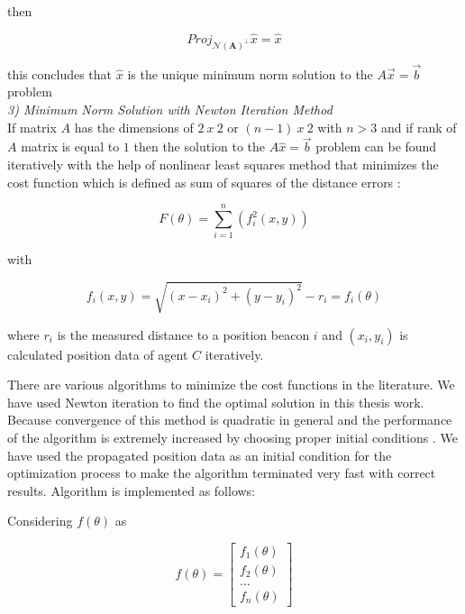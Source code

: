 then 
  
\begin{equation}
Proj_{ \mathcal{N}(\mathbf{A})^\perp}\hat{x} = \hat{x}
\end{equation}
  
this concludes that $\hat{x}$ is the unique minimum norm solution to the $A\vec{x} = \vec{b}$ problem\\
	
	
\textit{3) Minimum Norm Solution with Newton Iteration Method}\\	
If matrix $A$ has the dimensions of $2\ x\ 2$ or $(n-1)\ x\ 2$ with $n>3$ and if rank of $A$ matrix is equal to $1$ then the solution to the $A\hat{x} = \vec{b}$ problem can be found iteratively with the help of nonlinear least squares method that minimizes the cost function which is defined as sum of squares of the distance errors \cite{22} :
	
\begin{equation} \label{cost_func_tri}
F(\theta) = \sum_{i=1}^{n} \left(f_i^2(x,y)\right)
\end{equation}
	
with
	
\begin{equation}
f_i(x,y) = \sqrt{(x-x_i)^2 + (y - y_i)^2} - r_i = f_i(\theta) 
\end{equation}

where $r_i$ is the measured distance to a position beacon $i$ and $(x_i, y_i)$ is calculated position data of agent $C$ iteratively.

There are various algorithms to minimize the cost functions in the literature. We have used Newton iteration to find the optimal solution in this thesis work. Because convergence of this method is quadratic in general and the performance of the algorithm is extremely increased by choosing proper initial conditions \cite{wiki_newton}. We have used the propagated position data as an initial condition for the optimization process to make the algorithm terminated very fast with correct results. Algorithm is implemented as follows:

Considering  $f(\theta)$ as

\begin{equation}
f(\theta) = \begin{bmatrix}
f_1(\theta) \\
f_2(\theta) \\
...         \\
f_n(\theta)
\end{bmatrix}
\end{equation}


